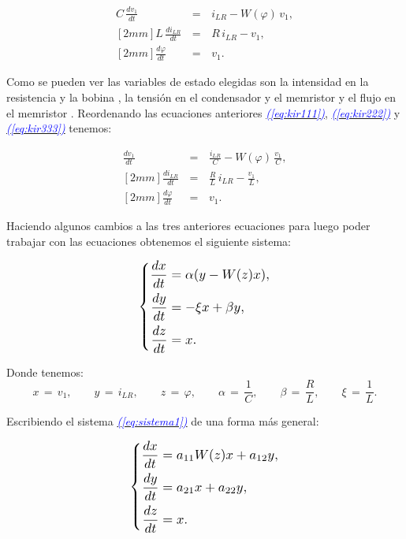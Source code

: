 \documentclass[12pt,a4paper]{report} %
\newcommand{\eref}[1]{\hyperref[#1]{\textcolor{blue}{\textit{(\ref*{#1})}}}}
\begin{document}
	
	\begin{eqnarray}
		C\,\frac{dv_1}{dt}\,&=&\,i_{LR}-W(\varphi)\,v_1 \label{eq:kir111}, \\ [2mm]
		L\,\frac{di_{LR}}{dt}\,&=&\,R\,i_{LR}-v_1 \label{eq:kir222}, \\ [2mm]
		\frac{d\varphi}{dt}\,&=&\,v_1. \label{eq:kir333}
	\end{eqnarray}\smallskip
	
	Como se pueden ver las variables de estado elegidas son la intensidad en la resistencia y la bobina , la tensión en el condensador y el memristor  y el flujo en el memristor \bm{$\varphi$}.
	\newpage
	Reordenando las ecuaciones anteriores \eref{eq:kir111}, \eref{eq:kir222} y \eref{eq:kir333} tenemos:
	
	\begin{eqnarray}
		\frac{dv_1}{dt}\,&=&\,\frac{i_{LR}}{C}-W(\varphi)\,\frac{v_1}{C} \label{eq:sis1}, \\ [2mm]
		\frac{di_{LR}}{dt}\,&=&\,\frac{R}{L}\,i_{LR}-\frac{v_1}{L} \label{eq:sis2}, \\ [2mm]
		\frac{d\varphi}{dt}\,&=&\,v_1. \label{eq:sis3}
	\end{eqnarray}\smallskip
	
	Haciendo algunos cambios a las tres anteriores ecuaciones para luego poder trabajar con las ecuaciones obtenemos el siguiente sistema:
    
	\begin{equation}
		\label{eq:sistema1}
		\scalebox{1.2}{$\displaystyle
			\left\{
			\begin{aligned}
				\frac{dx}{dt} &= \alpha (y - W(z)x), \\
				\frac{dy}{dt} &= -\xi x + \beta y, \\
				\frac{dz}{dt} &= x.
			\end{aligned}
			\right.
			$}
	\end{equation}\smallskip
	
	Donde tenemos:
	\begin{equation*}
		x\,=\,v_1, \qquad y\,=\,i_{LR}, \qquad z\,=\,\varphi, \qquad \alpha\,=\,\frac{1}{C}, \qquad \beta\,=\,\frac{R}{L}, \qquad \xi\,=\,\frac{1}{L}.
	\end{equation*}
	
	Escribiendo el sistema \eref{eq:sistema1} de una forma más general:
	
	\begin{equation}
		\label{eq:sistema}
		\scalebox{1.2}{$\displaystyle
			\left\{
			\begin{aligned}
				\frac{dx}{dt} &= a_{11}W(z)x+a_{12}y, \\
				\frac{dy}{dt} &=  a_{21}x+ a_{22}y, \\
				\frac{dz}{dt} &= x.
			\end{aligned}
			\right.
			$}
	\end{equation}\smallskip
	
\end{document}

